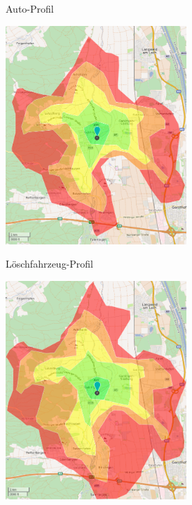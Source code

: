 \begin{figure}[H]
\begin{subfigure}{0.49\textwidth}
\caption{Auto-Profil}
\label{fig:isocar}
\end{subfigure}
\begin{subfigure}{0.49\textwidth}
\centering
\includegraphics[width = 0.75\textwidth]{../media/isofire.png} \\
\caption{Löschfahrzeug-Profil}
\label{fig:isofire}
\end{subfigure}
\begin{subfigure}{0.49\textwidth}
\centering
\includegraphics[width = 0.75\textwidth]{../media/isoeme.png} \\

\end{subfigure}
\end{figure}
